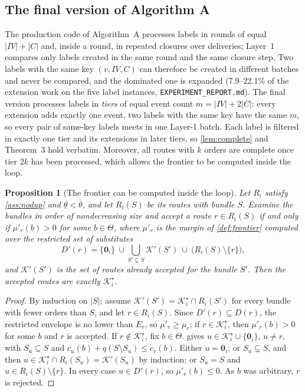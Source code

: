 \documentclass[11pt]{article}
\newtheorem{proposition}{Proposition}
\theoremstyle{definition}
\theoremstyle{remark}
\newcommand{\Ks}{\mathcal{K}^{\star}}
\newcommand{\thl}{\underline{\theta}}
\newcommand{\thu}{\overline{\theta}}
\newcommand{\idle}{\mathbf{0}}
\begin{document}
\subsection{The final version of Algorithm A}
\label{sec:finalA}

The production code of Algorithm~A processes labels in rounds of equal
$|IV|+|C|$ and, inside a round, in repeated closures over deliveries; Layer~1
compares only labels created in the same round and the same closure step. Two
labels with the same key $(v,IV,C)$ can therefore be created in different
batches and never be compared, and the dominated one is expanded (7.9--22.1\%
of the extension work on the five label instances, \texttt{EXPERIMENT\_REPORT.md}).
The final version processes labels in \emph{tiers} of equal event count
$m=|IV|+2|C|$: every extension adds exactly one event, two labels with the same
key have the same $m$, so every pair of same-key labels meets in one Layer-1
batch. Each label is filtered in exactly one tier and its extensions in later
tiers, so \cref{lem:complete} and Theorem~3 hold verbatim. Moreover, all routes
with $k$ orders are complete once tier $2k$ has been processed, which allows the
frontier to be computed inside the loop.

\begin{proposition}[The frontier can be computed inside the loop]\label{prop:inloop}
Let $R_i$ satisfy \cref{ass:nodup} and $\thl<\thu$, and let $R_i(S)$ be its
routes with bundle $S$. Examine the bundles in order of nondecreasing size and
accept a route $r\in R_i(S)$ if and only if $\mu'_r(b)>0$ for some $b\in\Theta$,
where $\mu'_r$ is the margin of \cref{def:frontier} computed over the restricted
set of substitutes
\[
D'(r)=\{\idle_i\}\ \cup\bigcup_{S'\subsetneq S}\mathcal K'(S')\ \cup\ \bigl(R_i(S)\setminus\{r\}\bigr),
\]
and $\mathcal K'(S')$ is the set of routes already accepted for the bundle $S'$.
Then the accepted routes are exactly $\Ks_i$.
\end{proposition}

\begin{proof}
By induction on $|S|$; assume $\mathcal K'(S')=\Ks_i\cap R_i(S')$ for every
bundle with fewer orders than $S$, and let $r\in R_i(S)$. Since $D'(r)\subseteq
D(r)$, the restricted envelope is no lower than $E_r$, so $\mu'_r\ge\mu_r$; if
$r\in\Ks_i$, then $\mu'_r(b)>0$ for some $b$ and $r$ is accepted. If
$r\notin\Ks_i$, fix $b\in\Theta$.  gives
$u\in\Ks_i\cup\{\idle_i\}$, $u\ne r$, with $S_u\subseteq S$ and
$c_u(b)+q(S\setminus S_u)\le c_r(b)$. Either $u=\idle_i$; or
$S_u\subsetneq S$, and then $u\in\Ks_i\cap R_i(S_u)=\mathcal K'(S_u)$ by
induction; or $S_u=S$ and $u\in R_i(S)\setminus\{r\}$. In every case
$u\in D'(r)$, so $\mu'_r(b)\le0$. As $b$ was arbitrary, $r$ is rejected.
\end{proof}
\end{document}
